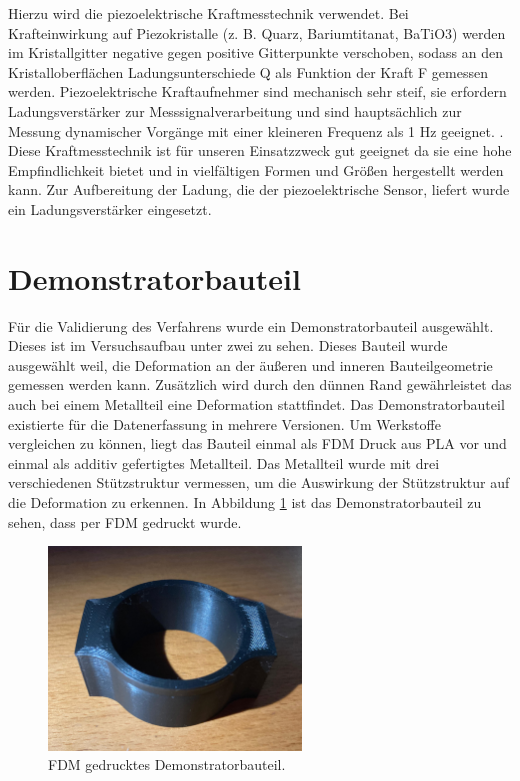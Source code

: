 Hierzu wird die piezoelektrische Kraftmesstechnik verwendet.
Bei Krafteinwirkung auf Piezokristalle (z. B. Quarz, Bariumtitanat, BaTiO3) 
werden im Kristallgitter negative gegen positive Gitterpunkte
verschoben, sodass an den Kristalloberflächen
Ladungsunterschiede Q als Funktion der Kraft F
gemessen werden.
Piezoelektrische Kraftaufnehmer sind mechanisch sehr steif, 
sie erfordern Ladungsverstärker
zur Messsignalverarbeitung und sind hauptsächlich zur Messung dynamischer Vorgänge
mit einer kleineren Frequenz als 1 Hz geeignet. \cite{Czichos.2020}. 
Diese Kraftmesstechnik ist 
für unseren Einsatzzweck gut geeignet da sie eine hohe Empfindlichkeit bietet 
und in vielfältigen Formen und Größen hergestellt werden kann. Zur Aufbereitung 
der Ladung, die der piezoelektrische Sensor, liefert wurde ein Ladungsverstärker 
eingesetzt.\cite{Schwartz.2006}

\section{Demonstratorbauteil} \label{demo_Bauteil}

Für die Validierung des Verfahrens wurde ein Demonstratorbauteil ausgewählt.
Dieses ist im Versuchsaufbau unter zwei zu sehen. Dieses Bauteil wurde ausgewählt 
weil, die Deformation an der äußeren und inneren Bauteilgeometrie gemessen werden kann.
Zusätzlich wird durch den dünnen Rand gewährleistet das auch bei einem Metallteil 
eine Deformation stattfindet.
Das Demonstratorbauteil existierte für die Datenerfassung in mehrere Versionen.
Um Werkstoffe vergleichen zu können, liegt das Bauteil einmal als FDM Druck aus PLA vor 
und einmal als additiv gefertigtes Metallteil.
Das Metallteil wurde mit drei verschiedenen Stützstruktur vermessen, um die Auswirkung 
der Stützstruktur auf die Deformation zu erkennen. In Abbildung \ref{fig:demofdm} ist 
das Demonstratorbauteil zu sehen, dass per FDM gedruckt wurde.

\begin{figure}[H]
    \centering
    \includegraphics[width=0.6\textwidth]{images/demo_fdm.jpg}
    \caption{FDM gedrucktes Demonstratorbauteil.}
    \label{fig:demofdm}
\end{figure}
